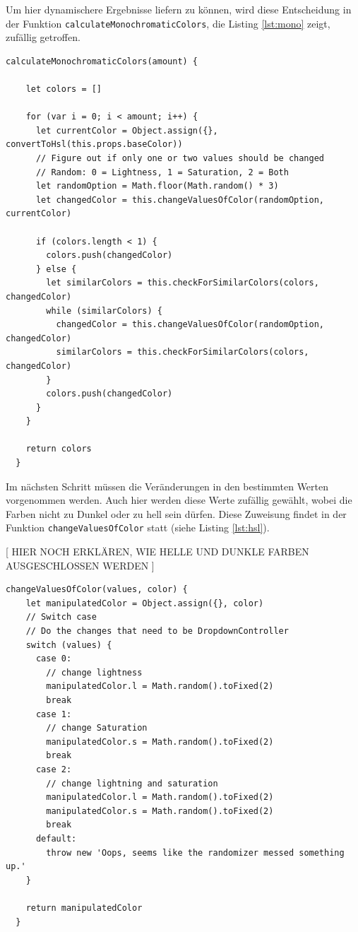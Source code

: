 Um hier dynamischere Ergebnisse liefern zu können, wird diese Entscheidung in der Funktion \verb|calculateMonochromaticColors|, die Listing \ref{lst:mono} zeigt, zufällig getroffen.

\begin{lstlisting}[caption=Berechnung eines Monochromatischen Farbschemas, label=lst:mono]
  calculateMonochromaticColors(amount) {

    let colors = []

    for (var i = 0; i < amount; i++) {
      let currentColor = Object.assign({}, convertToHsl(this.props.baseColor))
      // Figure out if only one or two values should be changed
      // Random: 0 = Lightness, 1 = Saturation, 2 = Both
      let randomOption = Math.floor(Math.random() * 3)
      let changedColor = this.changeValuesOfColor(randomOption, currentColor)

      if (colors.length < 1) {
        colors.push(changedColor)
      } else {
        let similarColors = this.checkForSimilarColors(colors, changedColor)
        while (similarColors) {
          changedColor = this.changeValuesOfColor(randomOption, changedColor)
          similarColors = this.checkForSimilarColors(colors, changedColor)
        }
        colors.push(changedColor)
      }
    }

    return colors
  }
\end{lstlisting}

Im nächsten Schritt müssen die Veränderungen in den bestimmten Werten vorgenommen werden. Auch hier werden diese Werte zufällig gewählt, wobei die Farben nicht zu Dunkel oder zu hell sein dürfen. Diese Zuweisung findet in der Funktion \verb|changeValuesOfColor| statt (siehe Listing \ref{lst:hsl}).

[ HIER NOCH ERKLÄREN, WIE HELLE UND DUNKLE FARBEN AUSGESCHLOSSEN WERDEN ]

\begin{lstlisting}[caption=Setzen der HSL-Werte, label=lst:hsl]
  changeValuesOfColor(values, color) {
    let manipulatedColor = Object.assign({}, color)
    // Switch case
    // Do the changes that need to be DropdownController
    switch (values) {
      case 0:
        // change lightness
        manipulatedColor.l = Math.random().toFixed(2)
        break
      case 1:
        // change Saturation
        manipulatedColor.s = Math.random().toFixed(2)
        break
      case 2:
        // change lightning and saturation
        manipulatedColor.l = Math.random().toFixed(2)
        manipulatedColor.s = Math.random().toFixed(2)
        break
      default:
        throw new 'Oops, seems like the randomizer messed something up.'
    }

    return manipulatedColor
  }
\end{lstlisting}

